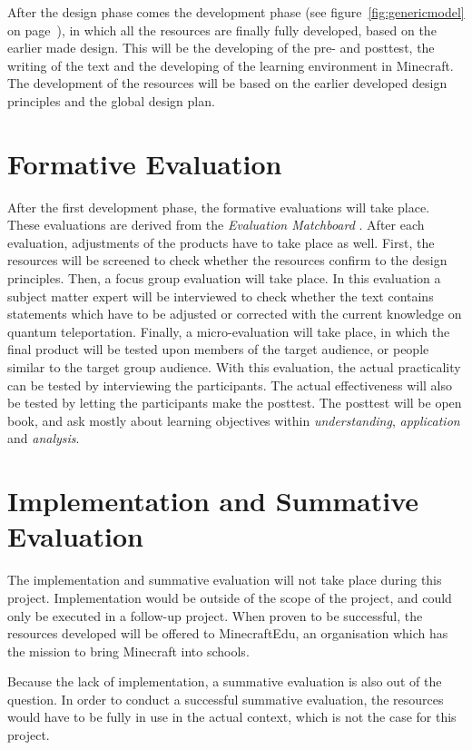 \documentclass[12pt]{report} %
\begin{document}
After the design phase comes the development phase \cite{genericmodel} (see figure~\ref{fig:genericmodel} on page~\pageref{fig:genericmodel}), in which all the resources are finally fully developed, based on the earlier made design. This will be the developing of the pre- and posttest, the writing of the text and the developing of the learning environment in Minecraft. The development of the resources will be based on the earlier developed design principles and the global design plan.

\section{Formative Evaluation}

After the first development phase, the formative evaluations will take place. These evaluations are derived from the \emph{Evaluation Matchboard} \cite{evamatchboard}. After each evaluation, adjustments of the products have to take place as well. First, the resources will be screened to check whether the resources confirm to the design principles. Then, a focus group evaluation will take place. In this evaluation a subject matter expert will be interviewed to check whether the text contains statements which have to be adjusted or corrected with the current knowledge on quantum teleportation. Finally, a micro-evaluation will take place, in which the final product will be tested upon members of the target audience, or people similar to the target group audience. With this evaluation, the actual practicality can be tested by interviewing the participants. The actual effectiveness will also be tested by letting the participants make the posttest. The posttest will be open book, and ask mostly about learning objectives within \emph{understanding}, \emph{application} and \emph{analysis}.

\section{Implementation and Summative Evaluation}

The implementation and summative evaluation will not take place during this project. Implementation would be outside of the scope of the project, and could only be executed in a follow-up project. When proven to be successful, the resources developed will be offered to MinecraftEdu, an organisation which has the mission to bring Minecraft into schools.

Because the lack of implementation, a summative evaluation is also out of the question. In order to conduct a successful summative evaluation, the resources would have to be fully in use in the actual context, which is not the case for this project.
\end{document}
